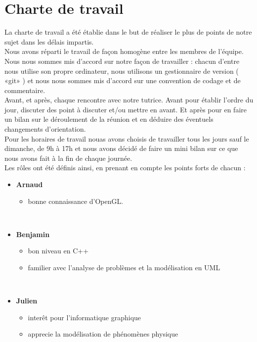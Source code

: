 \documentclass[a4paper,10pt]{article}
\begin{document}
\section{Charte de travail}
La charte de travail a été établie dans le but de réaliser le plus de
points de notre sujet dans les délais impartis.  \\

Nous avons réparti le travail de façon homogène entre les membres de
l'équipe.  Nous nous sommes mis d'accord sur notre façon de travailler
: chacun d'entre nous utilise son propre ordinateur, nous utilisons un
gestionnaire de version ( «git» ) et nous nous sommes mis d'accord sur
une convention de codage et de commentaire. \\

Avant, et après, chaque rencontre avec notre tutrice. Avant pour
établir l'ordre du jour, discuter des point à discuter et/ou mettre en
avant. Et après pour en faire un bilan sur le déroulement de la
réunion et en déduire des éventuels changements d'orientation. \\

Pour les horaires de travail nouas avons choisis de travailler tous
les jours sauf le dimanche, de 9h à 17h et nous avons décidé de faire
un mini bilan sur ce que nous avons fait à la fin de chaque journée.\\

Les rôles ont été définis ainsi, en prenant en compte les points forts
de chacun :\\

\begin{itemize}

\item \textbf{Arnaud}
\begin{itemize}
\item bonne connaissance d'OpenGL.
\end{itemize}
\quad \\

\item \textbf{Benjamin}
\begin{itemize}
\item bon niveau en C++
\item familier avec l'analyse de problèmes et la modélisation en UML
\end{itemize}
\quad \\

\item \textbf{Julien}
\begin{itemize}
\item interêt pour l'informatique graphique
\item apprecie la modélisation de phénomènes physique
\end{itemize}
\quad \\

\end{itemize}
\end{document}
